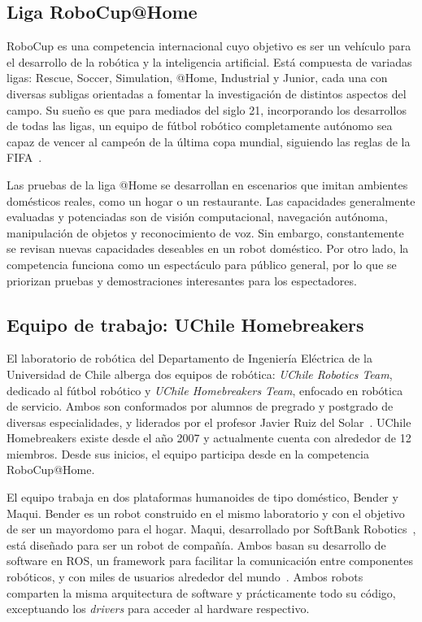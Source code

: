 \subsection{Liga RoboCup@Home}

RoboCup es una competencia internacional cuyo objetivo es ser un vehículo para el desarrollo de la robótica y la inteligencia artificial. Está compuesta de variadas ligas: Rescue, Soccer, Simulation, @Home, Industrial y Junior, cada una con diversas subligas orientadas a fomentar la investigación de distintos aspectos del campo. Su sueño es que para mediados del siglo 21, incorporando los desarrollos de todas las ligas, un equipo de fútbol robótico completamente autónomo sea capaz de vencer al campeón de la última copa mundial, siguiendo las reglas de la FIFA~\cite{robocup:rulebook_2018}.

Las pruebas de la liga @Home se desarrollan en escenarios que imitan ambientes domésticos reales, como un hogar o un restaurante. Las capacidades generalmente evaluadas y potenciadas son de visión computacional, navegación autónoma, manipulación de objetos y reconocimiento de voz. Sin embargo, constantemente se revisan nuevas capacidades deseables en un robot doméstico. Por otro lado, la competencia funciona como un espectáculo para público general, por lo que se priorizan pruebas y demostraciones interesantes para los espectadores.

\subsection{Equipo de trabajo: UChile Homebreakers}

El laboratorio de robótica del Departamento de Ingeniería Eléctrica de la Universidad de Chile alberga dos equipos de robótica: \textit{UChile Robotics Team}, dedicado al fútbol robótico y \textit{UChile Homebreakers Team}, enfocado en robótica de servicio. Ambos son conformados por alumnos de pregrado y postgrado de diversas especialidades, y liderados por el profesor Javier Ruiz del Solar~\cite{uchile-robotics}. UChile Homebreakers existe desde el año 2007 y actualmente cuenta con alrededor de 12 miembros. Desde sus inicios, el equipo participa desde en la competencia RoboCup@Home.

El equipo trabaja en dos plataformas humanoides de tipo doméstico, Bender y Maqui. Bender es un robot construido en el mismo laboratorio y con el objetivo de ser un mayordomo para el hogar. Maqui, desarrollado por SoftBank Robotics~\cite{softbank}, está diseñado para ser un robot de compañía. Ambos basan su desarrollo de software en ROS, un framework para facilitar la comunicación entre componentes robóticos, y con miles de usuarios alrededor del mundo~\cite{ROS:2009}. Ambos robots comparten la misma arquitectura de software y prácticamente todo su código, exceptuando los \textit{drivers} para acceder al hardware respectivo. 


